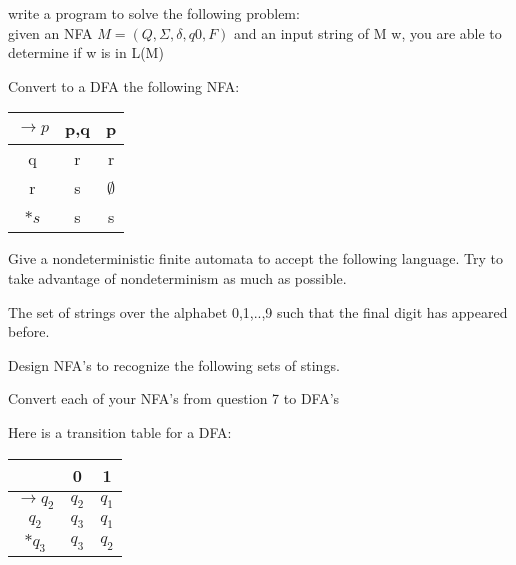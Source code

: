 \documentclass{exam}
\begin{document}
\begin{questions}
  \question
  write a program to solve the following problem:\\
  given an NFA $M = (Q, \Sigma, \delta, q0, F)$ and an input string of
  M w, you are able to determine if w is in L(M)

  \question
  Convert to a DFA the following NFA:
  \begin{center}
    \begin{tabular}{c|c|c}
      $\rightarrow p$&{p,q}&{p}\\
      \hline
      q&{r}&{r}\\
      r&{s}&$\emptyset$\\
      $*s$&{s}&{s}
    \end{tabular}
  \end{center}

  \question
  Give a nondeterministic finite automata to accept the following
  language. Try to take advantage of nondeterminism as much as possible.
  \begin{center}
    The set of strings over the alphabet {0,1,..,9} such that the final
    digit has appeared before.
  \end{center}

  \question
  Design NFA's to recognize the following sets of stings.

  \question
  Convert each of your NFA's from question 7 to DFA's

  \question
  Here is a transition table for a DFA:
  \begin{center}
    \begin{tabular}{c|c|c}
      &0&1\\
      \hline
      $\rightarrow q_2$&$q_2$&$q_1$\\
      $q_2$&$q_3$&$q_1$\\
      $*q_3$&$q_3$&$q_2$
    \end{tabular}
  \end{center}

\end{questions}
\end{document}
